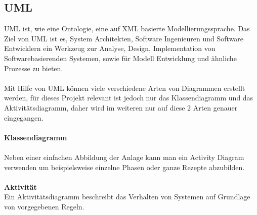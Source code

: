\begin{displayquote}
\subsection{UML}
UML ist, wie eine Ontologie, eine auf XML basierte Modellierungssprache.
Das Ziel von UML ist es, System Architekten, Software Ingenieuren und Software Entwicklern ein Werkzeug zur Analyse, Design, Implementation von Softwarebasierenden Systemen, sowie für Modell Entwicklung und ähnliche Prozesse zu bieten.\\
\\
Mit Hilfe von UML können viele verschiedene Arten von Diagrammen erstellt werden, für dieses Projekt relevant ist jedoch nur das Klassendiagramm und das Aktivitätsdiagramm, daher wird im weiteren nur auf diese 2 Arten genauer eingegangen.\\
\\
\textbf{Klassendiagramm}\\
\\
Neben einer einfachen Abbildung der Anlage kann man ein Activity Diagram verwenden um beispielsweise einzelne Phasen oder ganze Rezepte abzubilden.\\
\\
\textbf{Aktivität}\\
Ein Aktivitätsdiagramm beschreibt das Verhalten von Systemen auf Grundlage von vorgegebenen Regeln. 


\end{displayquote}
